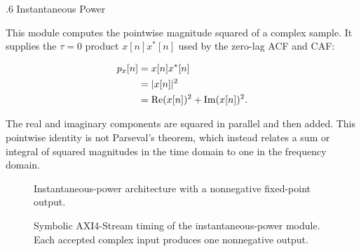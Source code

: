 %
%
\bigskip
{}
.6  \quad Instantaneous Power

This module computes the pointwise magnitude squared of a complex sample.  It supplies the $\tau=0$ product $x[n]x^{*}[n]$ used by the zero-lag ACF and CAF:

\begin{align*}
p_x[n] &= x[n]x^{*}[n] \\
       &= |x[n]|^{2} \\
       &= \operatorname{Re}(x[n])^{2}+\operatorname{Im}(x[n])^{2}.
\end{align*}

The real and imaginary components are squared in parallel and then added.  This pointwise identity is not Parseval's theorem, which instead relates a sum or integral of squared magnitudes in the time domain to one in the frequency domain.

\begin{figure}[H]
\begin{center}
\resizebox{\textwidth}{!}{}
\caption{Instantaneous-power architecture with a nonnegative fixed-point output.}
\label{fig:mag_sq}
\end{center}
\end{figure}

\begin{figure}[H]
\begin{center}
\resizebox{0.96\textwidth}{!}{}
\caption[Instantaneous-power AXI4-Stream timing.]{Symbolic AXI4-Stream timing of the instantaneous-power module. Each accepted complex input produces one nonnegative output.}
\label{fig:2_InstPwr}
\end{center}
\end{figure}

